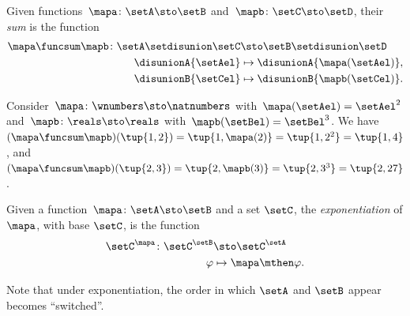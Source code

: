 \begin{ctdefinition}
    \label{def:sum-of-functions}
    Given functions~$\mapa\colon \setA \sto \setB$ and~$\mapb\colon \setC \sto \setD$, their \emph{sum} is the function
    \begin{equation}
        \begin{aligned}
            \mapa \funcsum \mapb \colon \setA \setdisunion \setC & \sto \setB\setdisunion \setD \\
            \disunionA{\setAel}                                  & \mapsto \disunionA{\mapa(\setAel)}, \\
            \disunionB{\setCel}                                  & \mapsto \disunionB{\mapb(\setCel)}.
            \\
        \end{aligned}
    \end{equation}
\end{ctdefinition}

\begin{example}
    Consider~$\mapa\colon \wnumbers \sto \natnumbers$ with~$\mapa(\setAel)=\setAel^2$ and~$\mapb\colon \reals \sto \reals$ with~$\mapb(\setBel)=\setBel^3$.
    We have~$(\mapa \funcsum \mapb)(\tup{1,2})=\tup{1,\mapa(2)}=\tup{1,2^2}=\tup{1,4}$, and~$(\mapa \funcsum \mapb)(\tup{2,3})=\tup{2,\mapb(3)}=\tup{2,3^3} = \tup{2,27}$.
\end{example}

\begin{ctdefinition}
    \label{def:exponentiation-of-functions}
    Given a function~$\mapa\colon \setA \sto \setB$ and a set $\setC$, the \emph{exponentiation} of $\mapa$, with base $\setC$, is the function
    \begin{equation}
        \begin{aligned}
            \setC^\mapa \colon \setC^\setB & \sto \setC^\setA \\
            \varphi                        & \mapsto \mapa \mthen \varphi.
        \end{aligned}
    \end{equation}
\end{ctdefinition}

\begin{remark}
    Note that under exponentiation, the order in which $\setA$ and $\setB$ appear becomes ``switched''.
\end{remark}

